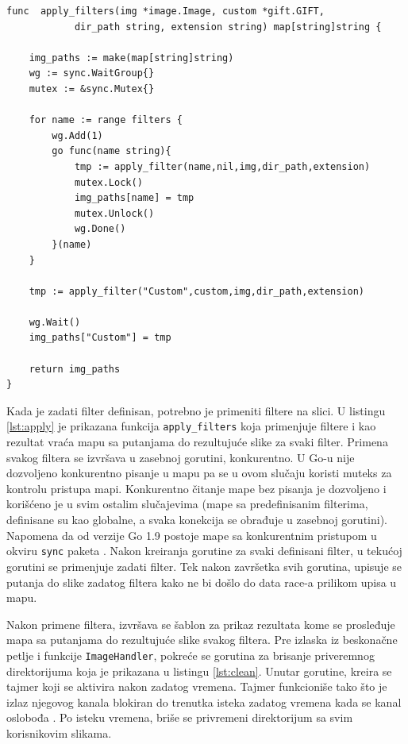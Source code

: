 \documentclass[12pt,oneside]{memoir}
\begin{document}
\begin{center}
\begin{lstlisting}[caption=Funkcija za paralelnu primenu filtera,label={lst:apply},  backgroundcolor=\color{background}]
func  apply_filters(img *image.Image, custom *gift.GIFT, 
			dir_path string, extension string) map[string]string {

	img_paths := make(map[string]string)
	wg := sync.WaitGroup{}
	mutex := &sync.Mutex{}

	for name := range filters {
		wg.Add(1)
		go func(name string){
			tmp := apply_filter(name,nil,img,dir_path,extension)
			mutex.Lock()
			img_paths[name] = tmp
			mutex.Unlock()
			wg.Done()
		}(name)
	}

	tmp := apply_filter("Custom",custom,img,dir_path,extension)

	wg.Wait()
	img_paths["Custom"] = tmp

	return img_paths
}
\end{lstlisting}
\end{center}

Kada je zadati filter definisan, potrebno je primeniti filtere na slici. U listingu \ref{lst:apply} je prikazana funkcija  \texttt{apply\_filters} koja primenjuje filtere i kao rezultat vraća mapu sa putanjama do rezultujuće slike za svaki filter. Primena svakog filtera se izvršava u zasebnoj gorutini, konkurentno. U Go-u nije dozvoljeno konkurentno pisanje u mapu pa se u ovom slučaju koristi muteks za kontrolu pristupa mapi. Konkurentno čitanje mape bez pisanja je dozvoljeno i korišćeno je u svim ostalim slučajevima (mape sa predefinisanim filterima, definisane su kao globalne, a svaka konekcija se obrađuje u zasebnoj gorutini). Napomena da od verzije Go 1.9 postoje mape sa konkurentnim pristupom u okviru \texttt{sync} paketa \cite{sync}. Nakon kreiranja gorutine za svaki definisani filter, u tekućoj gorutini se primenjuje zadati filter. Tek nakon završetka svih gorutina, upisuje se putanja do slike zadatog filtera kako ne bi došlo do data race-a prilikom upisa u mapu. 

Nakon primene filtera, izvršava se šablon za prikaz rezultata kome se prosleđuje mapa sa putanjama do rezultujuće slike svakog filtera. Pre izlaska iz beskonačne petlje i funkcije  \texttt{ImageHandler}, pokreće se gorutina za brisanje priveremnog direktorijuma koja je prikazana u listingu \ref{lst:clean}. Unutar gorutine, kreira se tajmer koji se aktivira nakon zadatog vremena. Tajmer funkcioniše tako što je izlaz njegovog kanala blokiran do trenutka isteka zadatog vremena kada se kanal oslobođa \cite{time}. Po isteku vremena, briše se privremeni direktorijum sa svim korisnikovim slikama. 
\end{document}
